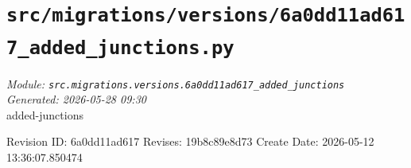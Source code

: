 
\section{\texttt{src/migrations/versions/6a0dd11ad617\_added\_junctions.py}}
\textit{Module: \texttt{src.migrations.versions.6a0dd11ad617\_added\_junctions}} \\
\textit{Generated: 2026-05-28 09:30} \\

added-junctions

Revision ID: 6a0dd11ad617
Revises: 19b8c89e8d73
Create Date: 2026-05-12 13:36:07.850474
